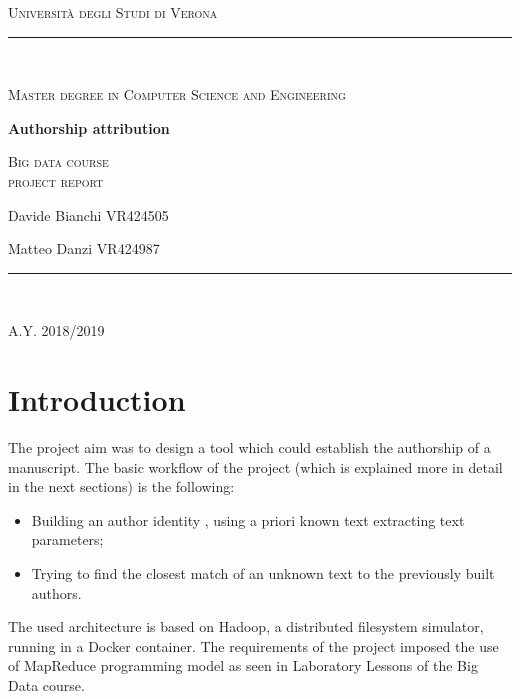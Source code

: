 \documentclass[a4paper,11pt, twoside]{article}
\begin{document}
	\clearpage
	\begin{titlepage}
		\centering
		{\scshape\LARGE Università degli Studi di Verona \par}
		\noindent\rule{\textwidth}{0.5pt}\\
		{\scshape\large Master degree in Computer Science and Engineering\par}
		\vspace{6cm}
		{\huge\bfseries Authorship attribution\par}
		\vspace{1cm}
		{\Large\scshape Big data course\\ \large project report\par}
		\vspace{2cm}
		{\large Davide Bianchi VR424505\par
		\large Matteo Danzi VR424987\par}
		\vspace{1cm}
		\vspace{5cm}
		\vspace*{\fill}
		\noindent\rule{\textwidth}{0.5pt}\\
		{\large A.Y. 2018/2019\par}
	\end{titlepage}
	\thispagestyle{empty}
	\newpage
	\tableofcontents
	\newpage
	
	\section{Introduction}
	The project aim was to design a tool which could establish the authorship of a manuscript. The basic workflow of the project (which is explained more in detail in the next sections) is the following:\begin{itemize}
		\item Building an author identity , using a priori known text extracting text parameters;
		\item Trying to find the closest match of an unknown text to the previously built authors.
	\end{itemize}

	The used architecture is based on Hadoop, a distributed filesystem simulator, running in a Docker container. The requirements of the project imposed the use of MapReduce programming model as seen in Laboratory Lessons of the Big Data course.
	
\end{document}
